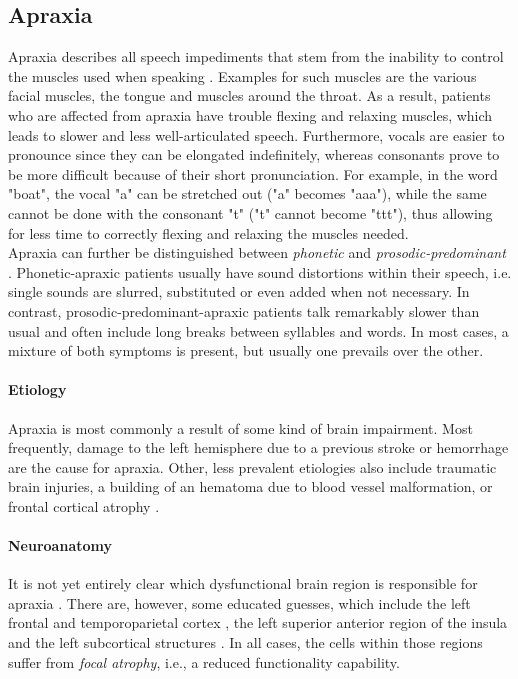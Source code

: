 \documentclass[draft,final]{vutinfth} %
\begin{document}
\subsection{Apraxia}
Apraxia describes all speech impediments that stem from the inability to control the muscles used when speaking \cite{ogar2005apraxia}. Examples for such muscles are the various facial muscles, the tongue and muscles around the throat. As a result, patients who are affected from apraxia have trouble flexing and relaxing muscles, which leads to slower and less well-articulated speech. Furthermore, vocals are easier to pronounce since they can be elongated indefinitely, whereas consonants prove to be more difficult because of their short pronunciation. For example, in the word "boat", the vocal "a" can be stretched out ("a" becomes "aaa"), while the same cannot be done with the consonant "t" ("t" cannot become "ttt"), thus allowing for less time to correctly flexing and relaxing the muscles needed. 
\\ Apraxia can further be distinguished between \emph{phonetic} and \emph{prosodic-predominant} \cite{utianski2023update}. Phonetic-apraxic patients usually have sound distortions within their speech, i.e. single sounds are slurred, substituted or even added when not necessary. In contrast, prosodic-predominant-apraxic patients talk remarkably slower than usual and often include long breaks between syllables and words. In most cases, a mixture of both symptoms is present, but usually one prevails over the other.

\paragraph{Etiology} Apraxia is most commonly a result of some kind of brain impairment. Most frequently, damage to the left hemisphere due to a previous stroke or hemorrhage are the cause for apraxia. Other, less prevalent etiologies also include traumatic brain injuries, a building of an hematoma due to blood vessel malformation, or frontal cortical atrophy \cite{ziegler2008apraxia}.

\paragraph{Neuroanatomy} It is not yet entirely clear which dysfunctional brain region is responsible for apraxia \cite{ogar2005apraxia}. There are, however, some educated guesses, which include the left frontal and temporoparietal cortex \cite{mcneil2000apraxia}, the left superior anterior region of the insula \cite{dronkers1996new} and the left subcortical structures \cite{peach2004phonemic}. In all cases, the cells within those regions suffer from \emph{focal atrophy}, i.e., a reduced functionality capability.
\end{document}

